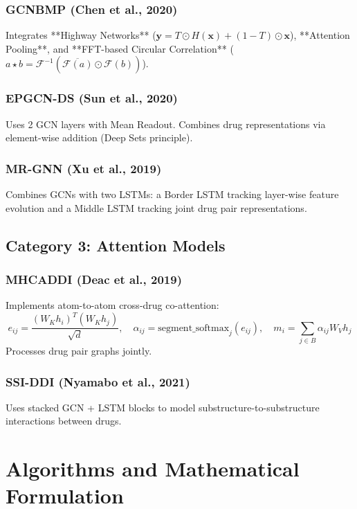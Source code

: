 \documentclass[12pt,a4paper,oneside]{article}
\begin{document}
\subsubsection{GCNBMP (Chen et al., 2020)}
Integrates **Highway Networks** ($\mathbf{y} = T \odot H(\mathbf{x}) + (1-T) \odot \mathbf{x}$), **Attention Pooling**, and **FFT-based Circular Correlation** ($a \star b = \mathcal{F}^{-1}(\overline{\mathcal{F}(a)} \odot \mathcal{F}(b))$).

\subsubsection{EPGCN-DS (Sun et al., 2020)}
Uses 2 GCN layers with Mean Readout. Combines drug representations via element-wise addition (Deep Sets principle).

\subsubsection{MR-GNN (Xu et al., 2019)}
Combines GCNs with two LSTMs: a Border LSTM tracking layer-wise feature evolution and a Middle LSTM tracking joint drug pair representations.

\subsection{Category 3: Attention Models}

\subsubsection{MHCADDI (Deac et al., 2019)}
Implements atom-to-atom cross-drug co-attention:
\[
e_{ij} = \frac{(W_K h_i)^T (W_K h_j)}{\sqrt{d}}, \quad \alpha_{ij} = \text{segment\_softmax}_j(e_{ij}), \quad m_i = \sum_{j \in B} \alpha_{ij} W_V h_j
\]
Processes drug pair graphs jointly.

\subsubsection{SSI-DDI (Nyamabo et al., 2021)}
Uses stacked GCN + LSTM blocks to model substructure-to-substructure interactions between drugs.

\section{Algorithms and Mathematical Formulation}\label{sec:algorithms}
\end{document}
